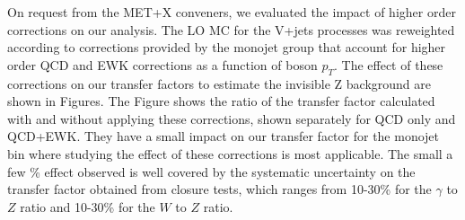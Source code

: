 On request from the MET+X conveners, we evaluated the impact of higher order corrections on our analysis. The LO MC for the V+jets processes was reweighted according to corrections provided by the monojet group that account for higher order QCD and EWK corrections as a function of boson $p_T$. The effect of these corrections on our transfer factors to estimate the invisible Z background are shown in Figures. The Figure shows the ratio of the transfer factor calculated with and without applying these corrections, shown separately for QCD only and QCD+EWK. They have a small impact on our transfer factor for the monojet bin where studying the effect of these corrections is most applicable. The small a few \% effect observed is well covered by the systematic uncertainty on the transfer factor obtained from closure tests, which ranges from 10-30\% for the $\gamma$ to $Z$ ratio and 10-30\% for the $W$ to $Z$ ratio. 
